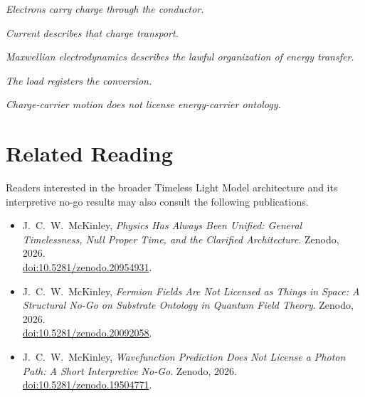 \documentclass[12pt,onecolumn]{article}
\begin{document}
\begin{center}
\textit{Electrons carry charge through the conductor.}

\vspace{0.5em}

\textit{Current describes that charge transport.}

\vspace{0.5em}

\textit{Maxwellian electrodynamics describes the lawful organization of energy transfer.}

\vspace{0.5em}

\textit{The load registers the conversion.}

\vspace{0.5em}

\textit{Charge-carrier motion does not license energy-carrier ontology.}
\end{center}


\section*{Related Reading}

Readers interested in the broader Timeless Light Model architecture and its interpretive no-go results may also consult the following publications.

\begin{itemize}

\item J.~C.~W.~McKinley,
\textit{Physics Has Always Been Unified: General Timelessness, Null Proper Time, and the Clarified Architecture}.
Zenodo, 2026.\\
\href{https://doi.org/10.5281/zenodo.20954931}{doi:10.5281/zenodo.20954931}.

\item J.~C.~W.~McKinley,
\textit{Fermion Fields Are Not Licensed as Things in Space: A Structural No-Go on Substrate Ontology in Quantum Field Theory}.
Zenodo, 2026.\\
\href{https://doi.org/10.5281/zenodo.20092058}{doi:10.5281/zenodo.20092058}.

\item J.~C.~W.~McKinley,
\textit{Wavefunction Prediction Does Not License a Photon Path: A Short Interpretive No-Go}.
Zenodo, 2026.\\
\href{https://doi.org/10.5281/zenodo.19504771}{doi:10.5281/zenodo.19504771}.

\end{itemize}
\end{document}
